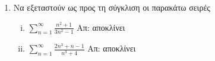 


\everymath{\displaystyle}



\begin{center}
\end{center}

\vspace{\baselineskip}



\begin{enumerate}

    \item Να εξεταστούν ως προς τη σύγκλιση οι παρακάτω σειρές 
        \begin{enumerate}[i)]
            \item $ \sum_{n=1}^{\infty} \frac{n^{2}+1}{3n^{2}-1} $ \hfill Απ: 
                αποκλίνει
            \item $ \sum_{n=1}^{\infty} \frac{2n^{3}+n-1}{n^{3}+4}  $ 
                \hfill Απ: αποκλίνει 
        \end{enumerate}


\end{enumerate}
